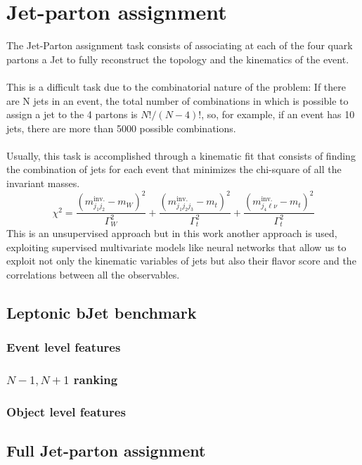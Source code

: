 \section{Jet-parton assignment}
The Jet-Parton assignment task consists of associating at each of the four quark partons a Jet to fully reconstruct the topology and the kinematics of the event.\\
\\
This is a difficult task due to the combinatorial nature of the problem: If there are N jets in an event, the total number of combinations in which is possible to assign a jet to the 4 partons is $N!/(N-4)!$, so, for example, if an event has 10 jets, there are more than 5000 possible combinations.\\
\\
Usually, this task is accomplished through a kinematic fit that consists of finding the combination of jets for each event that minimizes the chi-square of all the invariant masses.
\begin{equation}
    \chi^2=\frac{(m_{j_1j_2}^{\text{inv.}}-m_W)^2}{\Gamma^2_W}+\frac{(m_{j_1j_2j_3}^{\text{inv.}}-m_t)^2}{\Gamma^2_t}+\frac{(m_{j_4\ell\nu}^{\text{inv.}}-m_t)^2}{\Gamma^2_t}
\end{equation}
This is an unsupervised approach but in this work another approach is used, exploiting supervised multivariate models like neural networks that allow us to exploit not only the kinematic variables of jets but also their flavor score and the correlations between all the observables.

\subsection{Leptonic bJet benchmark}

\subsubsection*{Event level features}
\subsubsection*{{$N-1,N+1$} ranking}
\subsubsection*{Object level features}
\subsection{Full Jet-parton assignment}

